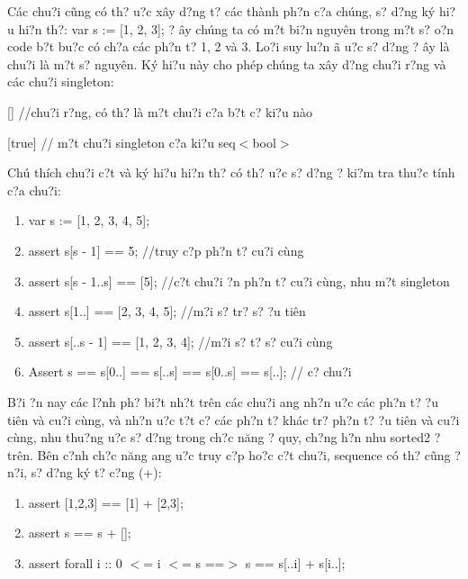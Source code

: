 \documentclass{article} %
\begin{document}
C\'{a}c chu?i c\~{u}ng c\'{o} th? {\dj}u?c x\^{a}y d?ng t? c\'{a}c th\`{a}nh ph?n c?a ch\'{u}ng, s? d?ng k\'{y} hi?u hi?n th?: var s := [1, 2, 3]; ? {\dj}\^{a}y ch\'{u}ng ta c\'{o} m?t bi?n nguy\^{e}n trong m?t s? {\dj}o?n code b?t bu?c c\'{o} ch?a c\'{a}c ph?n t? 1, 2 v\`{a} 3. Lo?i suy lu?n {\dj}\~{a} {\dj}u?c s? d?ng ? {\dj}\^{a}y l\`{a} chu?i l\`{a} m?t s? nguy\^{e}n. K\'{y} hi?u n\`{a}y cho ph\'{e}p ch\'{u}ng ta x\^{a}y d?ng chu?i r?ng v\`{a} c\'{a}c chu?i singleton:

[] //chu?i r?ng, c\'{o} th? l\`{a} m?t chu?i c?a b?t c? ki?u n\`{a}o

[true] // m?t chu?i singleton c?a ki?u seq$<$bool$>$

\noindent Ch\'{u} th\'{i}ch chu?i c?t v\`{a} k\'{y} hi?u hi?n th? c\'{o} th? {\dj}u?c s? d?ng {\dj}? ki?m tra thu?c t\'{i}nh c?a chu?i: 

\begin{enumerate}
\item  var s := [1, 2, 3, 4, 5];

\item  assert s[{\textbar}s{\textbar} - 1] == 5; //truy c?p ph?n t? cu?i c\`{u}ng

\item  assert s[{\textbar}s{\textbar} - 1..{\textbar}s{\textbar}] == [5]; //c?t chu?i {\dj}?n ph?n t? cu?i c\`{u}ng, nhu m?t singleton

\item  assert s[1..] == [2, 3, 4, 5]; //m?i s? tr? s? {\dj}?u ti\^{e}n 

\item  assert s[..{\textbar}s{\textbar} - 1] == [1, 2, 3, 4]; //m?i s? t? s? cu?i c\`{u}ng

\item  Assert s == s[0..] == s[..{\textbar}s{\textbar}] == s[0..{\textbar}s{\textbar}] == s[..]; // c? chu?i
\end{enumerate}

B?i {\dj}?n nay c\'{a}c l?nh ph? bi?t nh?t tr\^{e}n c\'{a}c chu?i {\dj}ang nh?n {\dj}u?c c\'{a}c ph?n t? {\dj}?u ti\^{e}n v\`{a} cu?i c\`{u}ng, v\`{a} nh?n {\dj}u?c t?t c? c\'{a}c ph?n t? kh\'{a}c tr? ph?n t? {\dj}?u ti\^{e}n v\`{a} cu?i c\`{u}ng, nhu thu?ng {\dj}u?c s? d?ng trong ch?c n\u{a}ng {\dj}? quy, ch?ng h?n nhu sorted2 ? tr\^{e}n. B\^{e}n c?nh ch?c n\u{a}ng {\dj}ang {\dj}u?c truy c?p ho?c c?t chu?i, sequence c\'{o} th? c\~{u}ng {\dj}? n?i, s? d?ng k\'{y} t? c?ng (+):

\begin{enumerate}
\item  assert [1,2,3] == [1] + [2,3];

\item  assert s == s + [];

\item  assert forall i :: 0 $<$= i $<$= {\textbar}s{\textbar} ==$>$ s == s[..i] + s[i..];
\end{enumerate}
\end{document}
